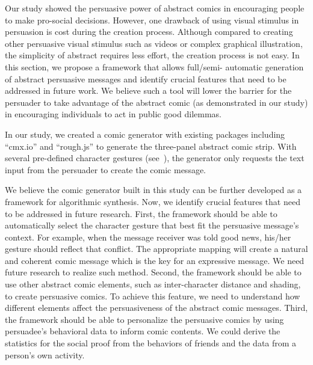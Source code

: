 Our study showed the persuasive power of abstract comics in encouraging people to make pro-social decisions. However, one drawback of using visual stimulus in persuasion is cost during the creation process. Although compared to creating other persuasive visual stimulus such as videos or complex graphical illustration, the simplicity of abstract requires less effort, the creation process is not easy. In this section, we propose a framework that allows full/semi- automatic generation of abstract persuasive messages and identify crucial features that need to be addressed in future work. We believe such a tool will lower the barrier for the persuader to take advantage of the abstract comic (as demonstrated in our study) in encouraging individuals to act in public good dilemmas.

In our study, we created a comic generator with existing packages including ``cmx.io'' \cite{cmx.io} and ``rough.js'' \cite{rough.js} to generate the three-panel abstract comic strip. With several pre-defined character gestures (see~), the generator only requests the text input from the persuader to create the comic message.  

We believe the comic generator built in this study can be further developed as a framework for algorithmic synthesis. Now, we identify crucial features that need to be addressed in future research. First, the framework should be able to automatically select the character gesture that best fit the persuasive message's context. For example, when the message receiver was told good news, his/her gesture should reflect that conflict. The appropriate mapping will create a natural and coherent comic message which is the key for an expressive message. We need future research to realize such method. Second, the framework should be able to use other abstract comic elements, such as inter-character distance and shading, to create persuasive comics. To achieve this feature, we need to understand how different elements affect the persuasiveness of the abstract comic messages. Third, the framework should be able to personalize the persuasive comics by using persuadee's behavioral data to inform comic contents. We could derive the statistics for the social proof from the behaviors of friends and the data from a person's own activity.

